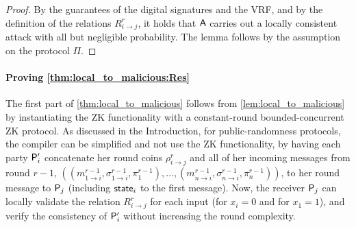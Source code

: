 \begin{proof}
By the guarantees of the digital signatures and the VRF, and by the definition of the relations $R^r_{i\to j}$, it holds that $\mathsf{A}$ carries out a locally consistent attack with all but negligible probability. The lemma follows by the assumption on the protocol $\Pi$.
\end{proof}


\paragraph{Proving \cref{thm:local_to_malicious:Res} }
The first part of \cref{thm:local_to_malicious} follows from \cref{lem:local_to_malicious} by instantiating the ZK functionality with a constant-round bounded-concurrent ZK protocol. As discussed in the Introduction, for public-randomness protocols, the compiler can be simplified and not use the ZK functionality, by having each party $\mathsf{P}_i'$ concatenate her \rth round coins $\rho_{i\to j}^r$ and all of her incoming messages from round $r-1$, \ie $((m^{r-1}_{1\to i},\sigma^{r-1}_{1\to i},\pi^{r-1}_1),\ldots,(m^{r-1}_{n\to i},\sigma^{r-1}_{n\to i},\pi^{r-1}_n))$, to her \rth round message to $\mathsf{P}_j$ (including ${\sf state}_i$ to the first message). Now, the receiver $\mathsf{P}_j$ can locally validate the relation $R^r_{i\to j}$ for each input (\ie for $x_i=0$ and for $x_1=1$), and verify the consistency of $\mathsf{P}_i'$ without increasing the round complexity.

